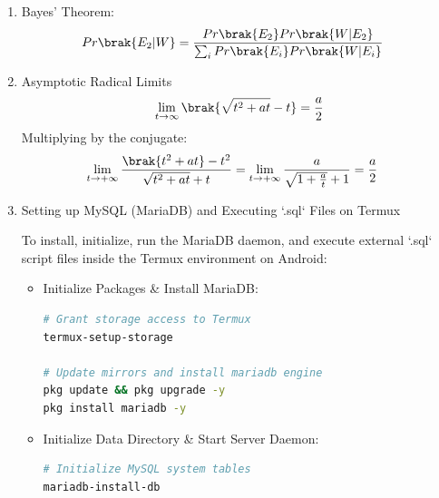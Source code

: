 \begin{enumerate}[label=\thesubsection.\arabic*, ref=\thesubsection.\theenumi]
	\item Bayes' Theorem:
	\begin{align}
		Pr\brak{E_2|W} &= \frac{Pr\brak{E_2}Pr\brak{W|E_2}}{\sum_{i}Pr\brak{E_i}Pr\brak{W|E_i}} \label{eq:DA2025-bayes_setup}
	\end{align}
	
	\item Asymptotic Radical Limits
	\begin{align}
		\lim_{t \to \infty} \brak{\sqrt{t^2 + at} - t} = \frac{a}{2} \label{eq:DA2025-radical_limit}
	\end{align}
	\solution
	Multiplying by the conjugate:
	\begin{align}
		\lim_{t \to +\infty} \frac{\brak{t^2 + at} - t^2}{\sqrt{t^2 + at} + t} &= \lim_{t \to +\infty} \frac{a}{\sqrt{1 + \frac{a}{t}} + 1} = \frac{a}{2}
	\end{align}
	
	
\item Setting up MySQL (MariaDB) and Executing `.sql` Files on Termux


To install, initialize, run the MariaDB daemon, and execute external `.sql` script files inside the Termux environment on Android:

\begin{itemize}
	\item Initialize Packages \& Install MariaDB:
	\begin{lstlisting}[language=bash]
# Grant storage access to Termux
termux-setup-storage
		
# Update mirrors and install mariadb engine
pkg update && pkg upgrade -y
pkg install mariadb -y
	\end{lstlisting}
	
	\item Initialize Data Directory \& Start Server Daemon:
	\begin{lstlisting}[language=bash]
# Initialize MySQL system tables
mariadb-install-db
		

\end{lstlisting}
\end{itemize}
\end{enumerate}
